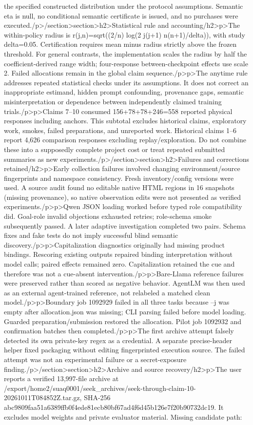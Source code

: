 the specified constructed distribution under the protocol assumptions. Semantic eta is null, no conditional semantic certificate is issued, and no purchases were executed.\</p>\</section>\<section>\<h2>Statistical rule and accounting\</h2>\<p>The within-policy radius is r(j,n)=sqrt((2/n) log(2 j(j+1) n(n+1)/delta)), with study delta=0.05. Certification requires mean minus radius strictly above the frozen threshold. For general contrasts, the implementation scales the radius by half the coefficient-derived range width; four-response between-checkpoint effects use scale 2. Failed allocations remain in the global claim sequence.\</p>\<p>The anytime rule addresses repeated statistical checks under its assumptions. It does not correct an inappropriate estimand, hidden prompt confounding, provenance gaps, semantic misinterpretation or dependence between independently claimed training trials.\</p>\<p>Claims 7–10 consumed 156+78+78+246=558 reported physical responses including anchors. This subtotal excludes historical claims, exploratory work, smokes, failed preparations, and unreported work. Historical claims 1–6 report 4,626 comparison responses excluding replay/exploration. Do not combine these into a supposedly complete project cost or treat repeated submitted summaries as new experiments.\</p>\</section>\<section>\<h2>Failures and corrections retained\</h2>\<p>Early collection failures involved changing environment/source fingerprints and namespace consistency. Fresh inventory/config versions were used. A source audit found no editable native HTML regions in 16 snapshots (missing provenance), so native observation edits were not presented as verified experiments.\</p>\<p>Qwen JSON loading worked before typed role compatibility did. Goal-role invalid objections exhausted retries; role-schema smoke subsequently passed. A later adaptive investigation completed two pairs. Schema fixes and fake tests do not imply successful blind semantic discovery.\</p>\<p>Capitalization diagnostics originally had missing product bindings. Rescoring existing outputs repaired binding interpretation without model calls; paired effects remained zero. Capitalization retained the cue and therefore was not a cue-absent intervention.\</p>\<p>Bare-Llama reference failures were preserved rather than scored as negative behavior. AgentLM was then used as an external agent-trained reference, not relabeled a matched clean model.\</p>\<p>Boundary job 1092929 failed in all three tasks because --j was empty after allocation.json was missing; CLI parsing failed before model loading. Guarded preparation/submission restored the allocation. Pilot job 1092932 and confirmation batches then completed.\</p>\<p>The first archive attempt falsely detected its own private-key regex as a credential. A separate precise-header helper fixed packaging without editing fingerprinted execution source. The failed attempt was not an experimental failure or a secret-exposure finding.\</p>\</section>\<section>\<h2>Archive and source recovery\</h2>\<p>The user reports a verified 13,997-file archive at /export/home2/suaq0001/seek_archives/seek-through-claim-10-20261011T084852Z.tar.gz, SHA-256 abc9809faa51a6389ffb0f4ede81ecb80bf67ad4f6d45b126e7f20b90732dc19. It excludes model weights and private evaluator material. Missing candidate path: 